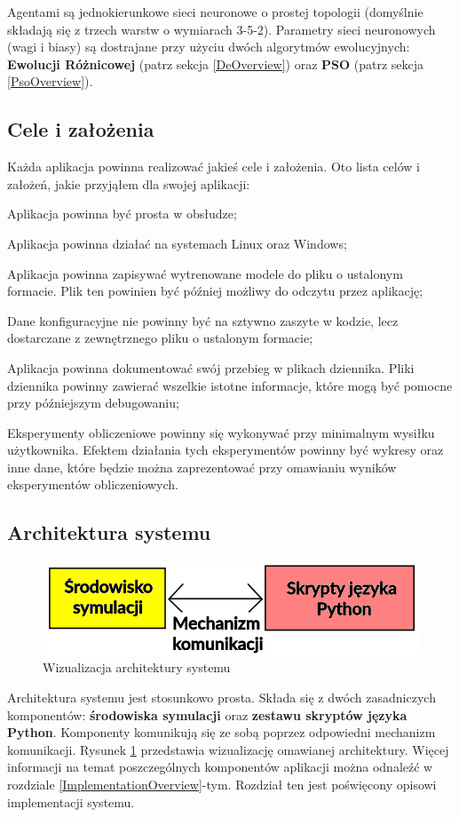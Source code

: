 Agentami są jednokierunkowe sieci neuronowe \cite{multilayerNN:article} o prostej topologii (domyślnie składają się z trzech warstw o wymiarach 3-5-2). Parametry sieci neuronowych (wagi i biasy) są dostrajane przy użyciu dwóch algorytmów ewolucyjnych: \textbf{Ewolucji Różnicowej} (patrz sekcja \ref{DeOverview}) oraz \textbf{PSO} (patrz sekcja \ref{PsoOverview}).

\subsection{Cele i założenia}
Każda aplikacja powinna realizować jakieś cele i założenia. Oto lista celów i założeń, jakie przyjąłem dla swojej aplikacji:
\begin{enumerate*}
\item Aplikacja powinna być prosta w obsłudze;
\item Aplikacja powinna działać na systemach Linux oraz Windows;
\item Aplikacja powinna zapisywać wytrenowane modele do pliku o ustalonym formacie. Plik ten powinien być później możliwy do odczytu przez aplikację;
\item Dane konfiguracyjne nie powinny być na sztywno zaszyte w kodzie, lecz dostarczane z zewnętrznego pliku o ustalonym formacie;
\item Aplikacja powinna dokumentować swój przebieg w plikach dziennika. Pliki dziennika powinny zawierać wszelkie istotne informacje, które mogą być pomocne przy późniejszym debugowaniu;
\item Eksperymenty obliczeniowe powinny się wykonywać przy minimalnym wysiłku użytkownika. Efektem działania tych eksperymentów powinny być wykresy oraz inne dane, które będzie można zaprezentować przy omawianiu wyników eksperymentów obliczeniowych.
\end{enumerate*}

\subsection{Architektura systemu}
\begin{figure}[H]
\centering
\includegraphics[width=15cm]{resources/figures/software_architecture.png}
\caption{Wizualizacja architektury systemu}
\label{SoftwareArchitecture}
\end{figure}
Architektura systemu jest stosunkowo prosta. Składa się z dwóch zasadniczych komponentów: \textbf{środowiska symulacji} oraz \textbf{zestawu skryptów języka Python}. Komponenty komunikują się ze sobą poprzez odpowiedni mechanizm komunikacji. Rysunek \ref{SoftwareArchitecture} przedstawia wizualizację omawianej architektury. Więcej informacji na temat poszczególnych komponentów aplikacji można odnaleźć w rozdziale \ref{ImplementationOverview}-tym. Rozdział ten jest poświęcony opisowi implementacji systemu.

